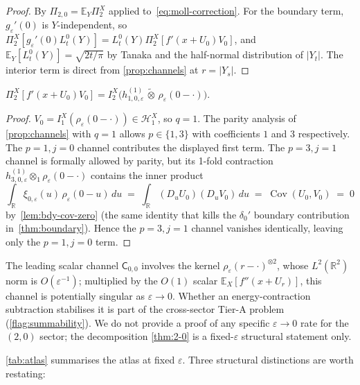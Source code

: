 \documentclass[EJP]{ejpecp}
\newcommand{\R}{\mathbb{R}}
\renewcommand{\E}{\mathbb{E}}
\newcommand{\Hilb}{\mathcal{H}}
\newcommand{\Pir}{\Pi}
\newcommand{\Channel}[1]{\mathsf{C}_{#1}}
\DeclareMathOperator{\Cov}{Cov}
\begin{document}
\begin{proof}
By $\Pir_{2,0}=\E_Y\Pir_2^X$ applied to~\eqref{eq:moll-correction}.
For the boundary term, $g_\varepsilon'(0)$ is $Y$-independent, so
$\Pir_2^X[g_\varepsilon'(0)L_t^{0}(Y)]=L_t^{0}(Y)\Pir_2^X[f'(x+U_0)V_0]$,
and $\E_Y[L_t^{0}(Y)]=\sqrt{2t/\pi}$ by Tanaka and the half-normal
distribution of $|Y_t|$. The interior term is direct from
\cref{prop:channels} at $r=|Y_s|$.
\end{proof}

\begin{proposition}\label{prop:2-0-bdy}
\(
 \Pir_2^X[f'(x+U_0)V_0]
 =I_2^X\!\bigl(h^{(1)}_{1,0,\varepsilon}\,\widetilde\otimes\,\rho_\varepsilon(0-\cdot)\bigr).
\)
\end{proposition}

\begin{proof}
$V_0=I_1^X(\rho_\varepsilon(0-\cdot))\in\Hilb_1^X$, so $q=1$. The
parity analysis of \cref{prop:channels} with $q=1$ allows
$p\in\{1,3\}$ with coefficients $1$ and $3$ respectively. The
$p=1,j=0$ channel contributes the displayed first term. The
$p=3,j=1$ channel is formally allowed by parity, but its 1-fold
contraction
\(
 h^{(1)}_{3,0,\varepsilon}\otimes_1\rho_\varepsilon(0-\cdot)
\)
contains the inner product
\[
 \int_\R\xi_{0,\varepsilon}(u)\,\rho_\varepsilon(0-u)\,du
 \;=\;\int_\R (D_u U_0)(D_u V_0)\,du
 \;=\;\Cov(U_0,V_0)
 \;=\;0
\]
by~\cref{lem:bdy-cov-zero} (the same identity that kills the
$\delta_0'$ boundary contribution in~\cref{thm:boundary}). Hence
the $p=3,j=1$ channel vanishes identically, leaving only the
$p=1,j=0$ term.
\end{proof}

\begin{remark}
\label{rem:2-0-status}
The leading scalar channel $\Channel{0,0}$ involves the kernel
$\rho_\varepsilon(r-\cdot)^{\otimes 2}$, whose $L^{2}(\R^{2})$ norm
is $O(\varepsilon^{-1})$; multiplied by the $O(1)$ scalar
$\E_X[f''(x+U_r)]$, this channel is potentially singular as
$\varepsilon\to 0$. Whether an energy-contraction subtraction
stabilises it is part of the cross-sector Tier-A problem
(\cref{flag:summability}). We do not provide a proof of any specific
$\varepsilon\to 0$ rate for the $(2,0)$ sector; the decomposition
\cref{thm:2-0} is a fixed-$\varepsilon$ structural statement only.
\end{remark}

\cref{tab:atlas} summarises the atlas at fixed $\varepsilon$.
Three structural distinctions are worth restating:
\end{document}
